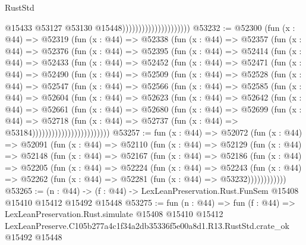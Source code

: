 \begin{lexlean}{RustStd}
\begin{coremodule}
                                              @15433
                                              @53127
                                              @53130
                                              @15448)))))))))))))))))))))
@53232 := @52300
    (fun (x : @44) =>
    @52319
      (fun (x : @44) =>
      @52338
        (fun (x : @44) =>
        @52357
          (fun (x : @44) =>
          @52376
            (fun (x : @44) =>
            @52395
              (fun (x : @44) =>
              @52414
                (fun (x : @44) =>
                @52433
                  (fun (x : @44) =>
                  @52452
                    (fun (x : @44) =>
                    @52471
                      (fun (x : @44) =>
                      @52490
                        (fun (x : @44) =>
                        @52509
                          (fun (x : @44) =>
                          @52528
                            (fun (x : @44) =>
                            @52547
                              (fun (x : @44) =>
                              @52566
                                (fun (x : @44) =>
                                @52585
                                  (fun (x : @44) =>
                                  @52604
                                    (fun (x : @44) =>
                                    @52623
                                      (fun (x : @44) =>
                                      @52642
                                        (fun (x : @44) =>
                                        @52661
                                          (fun (x : @44) =>
                                          @52680
                                            (fun (x : @44) =>
                                            @52699
                                              (fun (x : @44) =>
                                              @52718
                                                (fun (x : @44) =>
                                                @52737
                                                  (fun (x : @44) => @53184))))))))))))))))))))))))
@53257 := fun (x : @44) =>
  @52072
    (fun (x : @44) =>
    @52091
      (fun (x : @44) =>
      @52110
        (fun (x : @44) =>
        @52129
          (fun (x : @44) =>
          @52148
            (fun (x : @44) =>
            @52167
              (fun (x : @44) =>
              @52186
                (fun (x : @44) =>
                @52205
                  (fun (x : @44) =>
                  @52224
                    (fun (x : @44) =>
                    @52243
                      (fun (x : @44) =>
                      @52262 (fun (x : @44) => @52281 (fun (x : @44) => @53232))))))))))))
@53265 := (n : @44) ->
  (f : @44) -> LexLeanPreservation.Rust.FunSem @15408 @15410 @15412 @15492 @15448
@53275 := fun (n : @44) =>
  fun (f : @44) =>
  LexLeanPreservation.Rust.simulate
    @15408
    @15410
    @15412
    LexLeanPreserve.C105b277a4c1f34a2db35336f5e00a8d1.R13.RustStd.crate_ok
    @15492
    @15448
\end{coremodule}
\end{lexlean}
